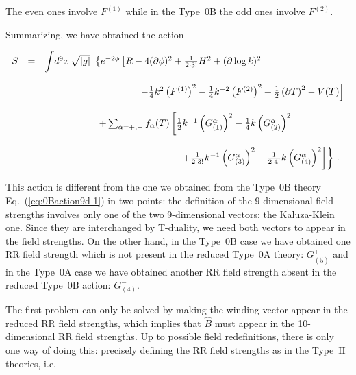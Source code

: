 \documentclass[12pt,a4paper]{article}
\begin{document}
\noindent The even ones involve $F^{(1)}$ while in the Type~0B
the odd ones involve $F^{(2)}$.

Summarizing, we have obtained the action

\begin{equation}
\begin{array}{rcl}
S & = & {\displaystyle\int} d^{9}x\,  \sqrt{|g|}\ 
\left\{ e^{-2\phi}
\left[R -4(\partial\phi)^{2} +{\textstyle\frac{1}{2\cdot 3!}}H^{2}
+(\partial\log{k})^{2} 
\right.
\right.\\
& & \\
& &
\hspace{3.5cm}
\left.
-{\textstyle\frac{1}{4}}k^{2} \left(F^{(1)}\right)^{2} 
-{\textstyle\frac{1}{4}}k^{-2}\left(F^{(2)}\right)^{2}
+\textstyle{\frac{1}{2}}\left(\partial T\right)^{2} -V(T)
\right]
\\
& & \\
& & 
\hspace{2cm}
+\sum_{\alpha=+,-}f_{\alpha}(T)
\left[\frac{1}{2}k^{-1}\left(G_{(1)}^{\alpha}\right)^{2} 
-\frac{1}{4}k\left(G_{(2)}^{\alpha}\right)^{2} 
\right.
\\
& & \\
& & 
\hspace{5cm}
\left.
\left.
+\frac{1}{2\cdot 3!}k^{-1}\left(G_{(3)}^{\alpha}\right)^{2}
-\frac{1}{2\cdot 4!}k\left(G_{(4)}^{\alpha}\right)^{2}
\right]
\right\}\, .\\
\end{array}
\label{eq:0Aaction9d-1}
\end{equation}

This action is different from the one we obtained from the Type~0B
theory Eq.~(\ref{eq:0Baction9d-1}) in two points: the definition of
the 9-dimensional field strengths involves only one of the two
9-dimensional vectors: the Kaluza-Klein one. Since they are
interchanged by T-duality, we need both vectors to appear in the 
field strengths.
On the other hand, in the Type~0B case we have obtained one
RR field strength which is not present in the reduced Type~0A theory:
$G^{+}_{(5)}$ and in the Type~0A case we have obtained another RR
field strength absent in the reduced Type~0B action: $G^{-}_{(4)}$.

The first problem can only be solved by making the winding vector
appear in the reduced RR field strengths, which implies that $\hat{B}$
must appear in the 10-dimensional RR field strengths. Up to possible
field redefinitions, there is only one way of doing this: precisely
defining the RR field strengths as in the Type~II theories, i.e.
\end{document}
